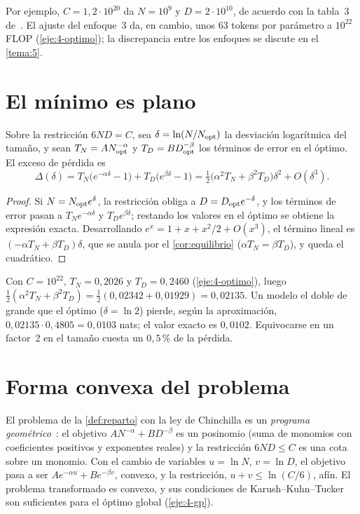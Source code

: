 Por ejemplo, $C=1{,}2\cdot 10^{20}$ da $N=10^{9}$ y $D=2\cdot 10^{10}$, de acuerdo con la tabla~3 de~\cite{hoffmann}. El ajuste del enfoque~3 da, en cambio, unos $63$ tokens por parámetro a $10^{22}$ FLOP (\cref{eje:4-optimo}); la discrepancia entre los enfoques se discute en el \cref{tema:5}.

\section{El mínimo es plano}

\begin{proposicion}\label{prop:plano}
Sobre la restricción $6ND=C$, sea $\delta=\ln(N/N_{\mathrm{opt}})$ la desviación logarítmica del tamaño, y sean $T_N=AN_{\mathrm{opt}}^{-\alpha}$ y $T_D=BD_{\mathrm{opt}}^{-\beta}$ los términos de error en el óptimo. El exceso de pérdida es
\[
\Delta(\delta)=T_N\bigl(e^{-\alpha\delta}-1\bigr)+T_D\bigl(e^{\beta\delta}-1\bigr)=\tfrac12\bigl(\alpha^{2}T_N+\beta^{2}T_D\bigr)\delta^{2}+O(\delta^{3}).
\]
\end{proposicion}

\begin{proof}
Si $N=N_{\mathrm{opt}} e^{\delta}$, la restricción obliga a $D=D_{\mathrm{opt}} e^{-\delta}$, y los términos de error pasan a $T_Ne^{-\alpha\delta}$ y $T_De^{\beta\delta}$; restando los valores en el óptimo se obtiene la expresión exacta. Desarrollando $e^{x}=1+x+x^{2}/2+O(x^{3})$, el término lineal es $(-\alpha T_N+\beta T_D)\delta$, que se anula por el \cref{cor:equilibrio} ($\alpha T_N=\beta T_D$), y queda el cuadrático.
\end{proof}

\begin{ejemplo}\label{ej:plano}
Con $C=10^{22}$, $T_N=0{,}2026$ y $T_D=0{,}2460$ (\cref{eje:4-optimo}), luego $\tfrac12(\alpha^{2}T_N+\beta^{2}T_D)=\tfrac12(0{,}02342+0{,}01929)=0{,}02135$. Un modelo el doble de grande que el óptimo ($\delta=\ln 2$) pierde, según la aproximación, $0{,}02135\cdot 0{,}4805=0{,}0103$ nats; el valor exacto es $0{,}0102$. Equivocarse en un factor~2 en el tamaño cuesta un $0{,}5\,\%$ de la pérdida.
\end{ejemplo}

\section{Forma convexa del problema}

El problema de la \cref{def:reparto} con la ley de Chinchilla es un \emph{programa geométrico}~\cite[§4.5]{bv}: el objetivo $AN^{-\alpha}+BD^{-\beta}$ es un posinomio (suma de monomios con coeficientes positivos y exponentes reales) y la restricción $6ND\le C$ es una cota sobre un monomio. Con el cambio de variables $u=\ln N$, $v=\ln D$, el objetivo pasa a ser $Ae^{-\alpha u}+Be^{-\beta v}$, convexo, y la restricción, $u+v\le\ln(C/6)$, afín. El problema transformado es convexo, y sus condiciones de Karush--Kuhn--Tucker son suficientes para el óptimo global (\cref{eje:4-gp}).


